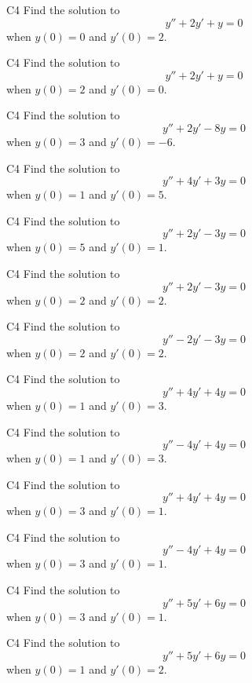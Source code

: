 \begin{problem}{C4}
Find the solution to
\[
y'' + 2y' + y = 0 
\]
when \(y(0)=0\) and \(y'(0)=2\).
\end{problem}

\begin{problem}{C4}
Find the solution to
\[
y'' + 2y' + y = 0 
\]
when \(y(0)=2\) and \(y'(0)=0\).
\end{problem}

\begin{problem}{C4}
Find the solution to
\[
y'' + 2y' - 8y = 0
\]
when \(y(0)=3\) and \(y'(0)=-6\).
\end{problem}

\begin{problem}{C4}
Find the solution to
\[
y'' + 4y' + 3y = 0
\]
when \(y(0)=1\) and \(y'(0)=5\).
\end{problem}

\begin{problem}{C4}
Find the solution to
\[
y'' + 2y' - 3y = 0
\]
when \(y(0)=5\) and \(y'(0)=1\).
\end{problem}

\begin{problem}{C4}
Find the solution to
\[
y'' + 2y' - 3y = 0
\]
when \(y(0)=2\) and \(y'(0)=2\).
\end{problem}

\begin{problem}{C4}
Find the solution to
\[
y'' - 2y' - 3y = 0
\]
when \(y(0)=2\) and \(y'(0)=2\).
\end{problem}

\begin{problem}{C4}
Find the solution to
\[
y'' + 4y' + 4y = 0
\]
when \(y(0)=1\) and \(y'(0)=3\).
\end{problem}

\begin{problem}{C4}
Find the solution to
\[
y'' - 4y' + 4y = 0
\]
when \(y(0)=1\) and \(y'(0)=3\).
\end{problem}

\begin{problem}{C4}
Find the solution to
\[
y'' + 4y' + 4y = 0
\]
when \(y(0)=3\) and \(y'(0)=1\).
\end{problem}

\begin{problem}{C4}
Find the solution to
\[
y'' - 4y' + 4y = 0
\]
when \(y(0)=3\) and \(y'(0)=1\).
\end{problem}

\begin{problem}{C4}
Find the solution to
\[
y'' + 5y' + 6y = 0
\]
when \(y(0)=3\) and \(y'(0)=1\).
\end{problem}

\begin{problem}{C4}
Find the solution to
\[
y'' + 5y' + 6y = 0
\]
when \(y(0)=1\) and \(y'(0)=2\).
\end{problem}

